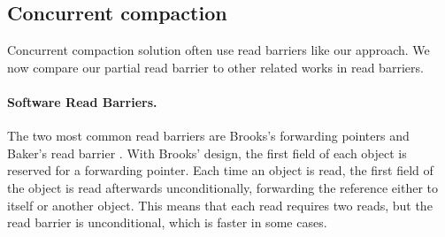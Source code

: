 \documentclass[sigplan,10pt,review,anonymous]{acmart}\settopmatter{printfolios=true,printccs=false,printacmref=false}
\begin{document}

\subsection{Concurrent compaction}
\label{sec:ConcCompactRel}

Concurrent compaction solution often use read barriers like our approach. We now compare our partial read barrier to other related works in read barriers.


\paragraph{Software Read Barriers.}
The two most common read barriers are Brooks's forwarding pointers \cite{BrooksForwarders} and Baker's read barrier \cite{BakerReadBarrier}.
With Brooks' design, the first field of each object is reserved for a forwarding pointer. Each time an object is read, the first field of the object is read afterwards unconditionally, forwarding the reference either to itself or another object. This means that each read requires two reads, but the read barrier is unconditional, which is faster in some cases.
\end{document}
